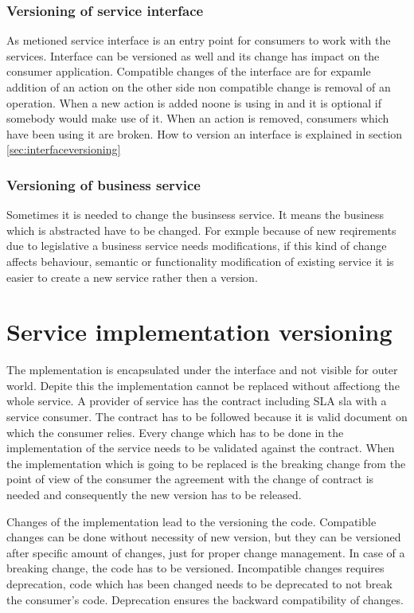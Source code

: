 \subsubsection{\textbf{Versioning of service interface}}
As metioned service interface is an entry point for consumers to work with the services. Interface can be versioned as well and its change has impact on the consumer application. Compatible changes of the interface are for expamle addition of an action on the other side non compatible change is removal of an operation. When a new action is added noone is using in and it is optional if somebody would make use of it. When an action is removed, consumers which have been using it are broken. How to version an interface is explained in section \ref{sec:interfaceversioning}

\subsubsection{\textbf{Versioning of business service}}
Sometimes it is needed to change the businsess service. It means the business which is abstracted have to be changed. For exmple because of new reqirements due to legislative a business service needs modifications, if this kind of change affects behaviour, semantic or functionality modification of existing service it is easier to create a new service rather then a version. 

\section{Service implementation versioning}
\label{sec:implversioning}
The mplementation is encapsulated under the interface and not visible for outer world. Depite this the implementation cannot be replaced without affectiong the whole service. A provider of service has the contract including SLA \gls{sla} with a service consumer. The contract has to be followed because it is valid document on which the consumer relies. 
Every change which has to be done in the implementation of the service needs to be validated against the contract. When the implementation which is going to be replaced is the breaking change from the point of view of the consumer the agreement with the change of contract is needed and consequently the new version has to be released.


Changes of the implementation lead to the versioning the code. Compatible changes can be done without necessity of new version, but they can be versioned after specific amount of changes, just for proper change management. In case of a breaking change, the code has to be versioned. Incompatible changes requires deprecation, code which has been changed needs to be deprecated to not break the consumer's code. Deprecation ensures the backward compatibility of changes.

